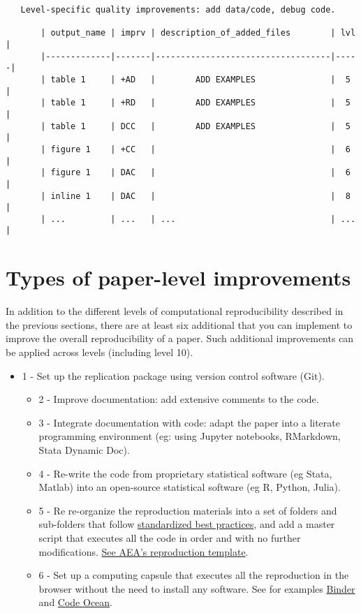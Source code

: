 \documentclass[]{book}
\providecommand{\tightlist}{%
  \setlength{\itemsep}{0pt}\setlength{\parskip}{0pt}}
\begin{document}
\begin{verbatim}
   Level-specific quality improvements: add data/code, debug code.

       | output_name | imprv | description_of_added_files        | lvl |
       |-------------|-------|-----------------------------------|-----|
       | table 1     | +AD   |        ADD EXAMPLES               |  5  |
       | table 1     | +RD   |        ADD EXAMPLES               |  5  |
       | table 1     | DCC   |        ADD EXAMPLES               |  5  |
       | figure 1    | +CC   |                                   |  6  |
       | figure 1    | DAC   |                                   |  6  |
       | inline 1    | DAC   |                                   |  8  |
       | ...         | ...   | ...                               | ... |  
\end{verbatim}

\hypertarget{paper-level}{%
\section{Types of paper-level improvements}\label{paper-level}}

In addition to the different levels of computational reproducibility described in the previous sections, there are at least six additional that you can implement to improve the overall reproducibility of a paper. Such additional improvements can be applied across levels (including level 10).

\begin{itemize}
\tightlist
\item
  1 - Set up the replication package using version control software (Git).

  \begin{itemize}
  \tightlist
  \item
    2 - Improve documentation: add extensive comments to the code.
  \item
    3 - Integrate documentation with code: adapt the paper into a literate programming environment (eg: using Jupyter notebooks, RMarkdown, Stata Dynamic Doc).
  \item
    4 - Re-write the code from proprietary statistical software (eg Stata, Matlab) into an open-source statistical software (eg R, Python, Julia).
  \item
    5 - Re re-organize the reproduction materials into a set of folders and sub-folders that follow \href{https://www.projecttier.org/tier-protocol/specifications/\#overview-of-the-documentation}{standardized best practices}, and add a master script that executes all the code in order and with no further modifications. \href{https://github.com/AEADataEditor/replication-template}{See AEA's reproduction template}.\\
  \item
    6 - Set up a computing capsule that executes all the reproduction in the browser without the need to install any software. See for examples \href{https://mybinder.org/}{Binder} and \href{https://codeocean.com/}{Code Ocean}.
  \end{itemize}
\end{itemize}
\end{document}
